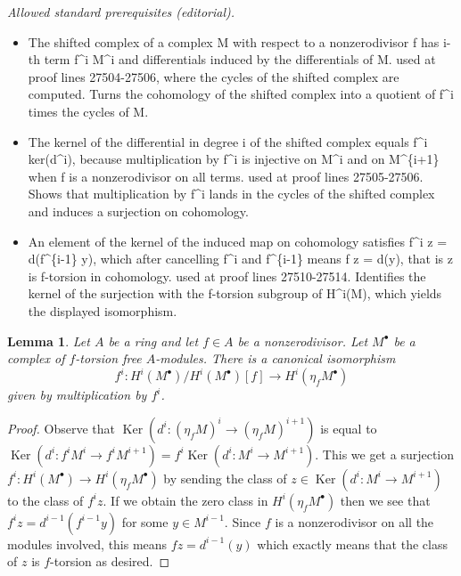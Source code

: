 \documentclass[10pt,a4paper]{amsart}
\theoremstyle{plain}
\newtheorem{lemma}[subsection]{Lemma}
\theoremstyle{definition}
\theoremstyle{remark}
\numberwithin{equation}{subsection}
\def\Ker{\mathop{\mathrm{Ker}}}
\begin{document}
\noindent\textit{Allowed standard prerequisites (editorial).}\begin{itemize}
\item The shifted complex of a complex M with respect to a nonzerodivisor f has i-th term f\textasciicircum{}i M\textasciicircum{}i and differentials induced by the differentials of M. used at proof lines 27504-27506, where the cycles of the shifted complex are computed. Turns the cohomology of the shifted complex into a quotient of f\textasciicircum{}i times the cycles of M.
\item The kernel of the differential in degree i of the shifted complex equals f\textasciicircum{}i ker(d\textasciicircum{}i), because multiplication by f\textasciicircum{}i is injective on M\textasciicircum{}i and on M\textasciicircum{}\{i+1\} when f is a nonzerodivisor on all terms. used at proof lines 27505-27506. Shows that multiplication by f\textasciicircum{}i lands in the cycles of the shifted complex and induces a surjection on cohomology.
\item An element of the kernel of the induced map on cohomology satisfies f\textasciicircum{}i z = d(f\textasciicircum{}\{i-1\} y), which after cancelling f\textasciicircum{}i and f\textasciicircum{}\{i-1\} means f z = d(y), that is z is f-torsion in cohomology. used at proof lines 27510-27514. Identifies the kernel of the surjection with the f-torsion subgroup of H\textasciicircum{}i(M), which yields the displayed isomorphism.
\end{itemize}\medskip
\begin{lemma}
\label{lemma-eta-first-property}
Let $A$ be a ring and let $f \in A$ be a nonzerodivisor. Let $M^\bullet$ be
a complex of $f$-torsion free $A$-modules. There is a canonical isomorphism
$$
f^i : H^i(M^\bullet)/H^i(M^\bullet)[f] \longrightarrow H^i(\eta_fM^\bullet)
$$
given by multiplication by $f^i$.
\end{lemma}

\begin{proof}
Observe that $\Ker(d^i : (\eta_fM)^i \to (\eta_fM)^{i + 1})$
is equal to
$\Ker(d^i : f^iM^i \to f^iM^{i + 1}) = f^i\Ker(d^i : M^i \to M^{i + 1})$.
This we get a surjection
$f^i : H^i(M^\bullet) \to H^i(\eta_fM^\bullet)$
by sending the class of $z \in \Ker(d^i : M^i \to M^{i + 1})$
to the class of $f^iz$. If we obtain the zero class in
$H^i(\eta_fM^\bullet)$ then we see that $f^i z = d^{i - 1}(f^{i - 1}y)$
for some $y \in M^{i - 1}$. Since $f$ is a nonzerodivisor on all
the modules involved, this means $f z = d^{i - 1}(y)$ which
exactly means that the class of $z$ is $f$-torsion as desired.
\end{proof}
\end{document}
